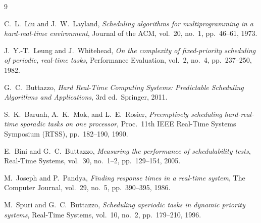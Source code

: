 \documentclass[12pt,a4paper]{article}
\begin{document}
\begin{thebibliography}{9}

C.\ L.\ Liu and J.\ W.\ Layland,
\textit{Scheduling algorithms for multiprogramming in a hard-real-time environment},
Journal of the ACM, vol.\ 20, no.\ 1, pp.\ 46--61, 1973.

J.\ Y.-T.\ Leung and J.\ Whitehead,
\textit{On the complexity of fixed-priority scheduling of periodic, real-time tasks},
Performance Evaluation, vol.\ 2, no.\ 4, pp.\ 237--250, 1982.

G.\ C.\ Buttazzo,
\textit{Hard Real-Time Computing Systems: Predictable Scheduling Algorithms and Applications},
3rd ed.\ Springer, 2011.

S.\ K.\ Baruah, A.\ K.\ Mok, and L.\ E.\ Rosier,
\textit{Preemptively scheduling hard-real-time sporadic tasks on one processor},
Proc.\ 11th IEEE Real-Time Systems Symposium (RTSS), pp.\ 182--190, 1990.

E.\ Bini and G.\ C.\ Buttazzo,
\textit{Measuring the performance of schedulability tests},
Real-Time Systems, vol.\ 30, no.\ 1--2, pp.\ 129--154, 2005.

M.\ Joseph and P.\ Pandya,
\textit{Finding response times in a real-time system},
The Computer Journal, vol.\ 29, no.\ 5, pp.\ 390--395, 1986.

M.\ Spuri and G.\ C.\ Buttazzo,
\textit{Scheduling aperiodic tasks in dynamic priority systems},
Real-Time Systems, vol.\ 10, no.\ 2, pp.\ 179--210, 1996.

\end{thebibliography}
\end{document}
